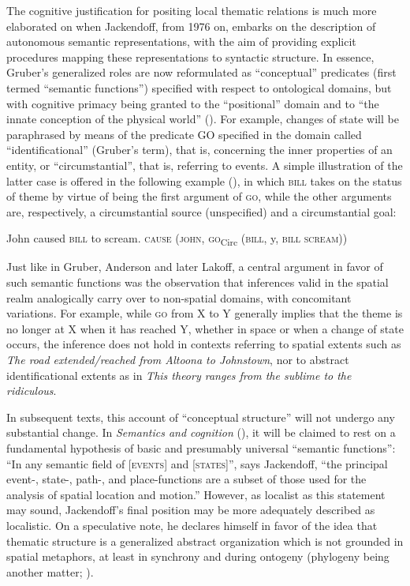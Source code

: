 \documentclass[english,output=paper,colorlinks,citecolor=brown]{../langscibook}
\begin{document}
The cognitive justification for positing local thematic relations is much more elaborated on when Jackendoff, from 1976 on, embarks on the description of autonomous semantic representations, with the aim of providing explicit procedures mapping these representations to syntactic structure. In essence, Gruber’s generalized roles are now reformulated as “conceptual” predicates (first termed “semantic functions”) specified with respect to ontological domains, but with cognitive primacy being granted to the “positional” domain and to “the innate conception of the physical world” (\citeyear[149]{Jackendoff1976}). For example, changes of state will be paraphrased by means of the predicate GO specified in the domain called “identificational” (Gruber’s term), that is, concerning the inner properties of an entity, or “circumstantial”, that is, referring to events. A simple illustration of the latter case is offered in the following example (\citeyear[129]{Jackendoff1976}), in which \textsc{bill} takes on the status of theme by virtue of being the first argument of \textsc{go}, while the other arguments are, respectively, a circumstantial source (unspecified) and a circumstantial goal:

\ea
\ea John caused \textsc{bill} to scream.
\ex \textsc{cause} (\textsc{john}, \textsc{go}\textsubscript{Circ} (\textsc{bill}, y, \textsc{bill scream}))
\z
\z

Just like in Gruber, Anderson and later Lakoff, a central argument in favor of such semantic functions was the observation that inferences valid in the spatial realm analogically carry over to non-spatial domains, with concomitant variations. For example, while \textsc{go} from X to Y generally implies that the theme is no longer at X when it has reached Y, whether in space or when a change of state occurs, the inference does not hold in contexts referring to spatial extents such as \textit{The road extended\slash reached from Altoona to Johnstown}, nor to abstract identificational extents as in \textit{This theory ranges from the sublime to the ridiculous}.

In subsequent texts, this account of “conceptual structure” will not undergo any substantial change. In \textit{Semantics and cognition} (\citeyear[188]{Jackendoff1983}), it will be claimed to rest on a fundamental hypothesis of basic and presumably universal “semantic functions”: “In any semantic field of [\textsc{events}] and [\textsc{states}]”, says Jackendoff, “the principal event-, state-, path-, and place-functions are a subset of those used for the analysis of spatial location and motion.” However, as localist as this statement may sound, Jackendoff’s final position may be more adequately described as localistic. On a speculative note, he declares himself in favor of the idea that thematic structure is a generalized abstract organization which is not grounded in spatial metaphors, at least in synchrony and during ontogeny (phylogeny being another matter; \citeyear[210]{Jackendoff1983}). 
\end{document}
